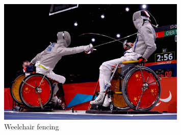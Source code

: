 \begin{enumerate}
\begin{figure}[htbp] %
\centering
\includegraphics[width=0.8\textwidth]{Images/weelchair_fencing.jpg}
\caption{Weelchair fencing}
\label{fig:my_image}
\end{figure}

\end{enumerate}